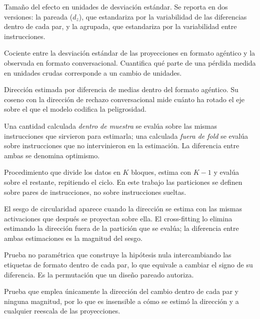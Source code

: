 \documentclass[12pt,a4paper]{article}
\begin{document}
\begin{description}[leftmargin=0pt, style=nextline, itemsep=0.45em]
  \item[$d$ de Cohen] Tamaño del efecto en unidades de desviación estándar. Se reporta en dos versiones: la pareada ($d_z$), que estandariza por la variabilidad de las diferencias dentro de cada par, y la agrupada, que estandariza por la variabilidad entre instrucciones.

  \item[Contracción de escala ($\kappa$)] Cociente entre la desviación estándar de las proyecciones en formato agéntico y la observada en formato conversacional. Cuantifica qué parte de una pérdida medida en unidades crudas corresponde a un cambio de unidades.

  \item[$\bm{w}_{\text{ag}}$] Dirección estimada por diferencia de medias dentro del formato agéntico. Su coseno con la dirección de rechazo conversacional mide cuánto ha rotado el eje sobre el que el modelo codifica la peligrosidad.

  \item[Dentro de muestra y fuera de fold] Una cantidad calculada \emph{dentro de muestra} se evalúa sobre las mismas instrucciones que sirvieron para estimarla; una calculada \emph{fuera de fold} se evalúa sobre instrucciones que no intervinieron en la estimación. La diferencia entre ambas se denomina optimismo.

  \item[Validación cruzada en $K$ particiones] Procedimiento que divide los datos en $K$ bloques, estima con $K-1$ y evalúa sobre el restante, repitiendo el ciclo. En este trabajo las particiones se definen sobre pares de instrucciones, no sobre instrucciones sueltas.

  \item[Cross-fitting y sesgo de circularidad] El sesgo de circularidad aparece cuando la dirección se estima con las mismas activaciones que después se proyectan sobre ella. El cross-fitting lo elimina estimando la dirección fuera de la partición que se evalúa; la diferencia entre ambas estimaciones es la magnitud del sesgo.

  \item[Prueba de permutación de signos] Prueba no paramétrica que construye la hipótesis nula intercambiando las etiquetas de formato dentro de cada par, lo que equivale a cambiar el signo de su diferencia. Es la permutación que un diseño pareado autoriza.

  \item[Prueba de signos] Prueba que emplea únicamente la dirección del cambio dentro de cada par y ninguna magnitud, por lo que es insensible a cómo se estimó la dirección y a cualquier reescala de las proyecciones.


\end{description}
\end{document}
